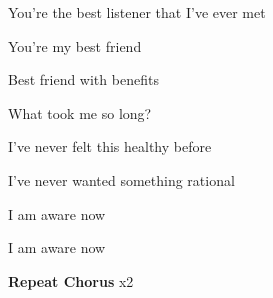 You're the best listener that I've ever met

You're my best friend

Best friend with benefits

What took me so long?

I've never felt this healthy before

I've never wanted something rational

I am aware now

I am aware now

\textbf{Repeat Chorus} x2
